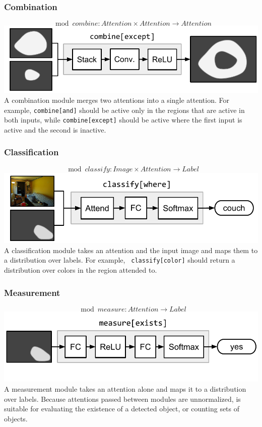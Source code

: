 \subsubsection*{Combination}
\[
  \mod{combine} : \mathit{Attention} \times \mathit{Attention} \to
  \mathit{Attention}
\]
\includegraphics[width=\columnwidth]{fig/combine}
A combination module  merges two attentions into a single
attention. For example, {\small\tt combine[and]} should be active only in the
regions that are active in both inputs, while {\small\tt{combine[except]}}
should be active where the first input is active and the second is
inactive.

\subsubsection*{Classification}
\[
  \mod{classify} : \mathit{Image} \times \mathit{Attention} \to
  \mathit{Label}
\]
\includegraphics[width=\columnwidth]{fig/classify}
A classification module  takes an attention and the input
image and maps them to a distribution over labels. For example, {\small\tt
classify[color]} should return a distribution over colors in the region
attended to.

\subsubsection*{Measurement}
\[
  \mod{measure} : \mathit{Attention} \to \mathit{Label}
\]
\includegraphics[width=\columnwidth]{fig/measure}
A measurement module  takes an attention alone and maps it to
a distribution over labels. Because attentions passed between modules are
unnormalized,  is suitable for evaluating the existence of a
detected object, or counting sets of objects.

